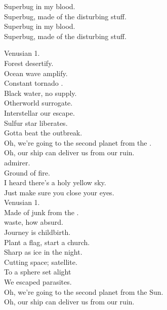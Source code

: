 Superbug in my blood. \\
Superbug, made of the disturbing stuff. \\
Superbug in my blood. \\
Superbug, made of the disturbing stuff. \\





Venusian 1. \\

Forest desertify. \\
Ocean wave amplify. \\
Constant tornado . \\
Black water, no supply. \\
Otherworld surrogate. \\
Interstellar our escape. \\
Sulfur star liberates. \\
Gotta beat the outbreak. \\

Oh, we're going to the second planet from the . \\
Oh, our ship can deliver us from our ruin. \\

 admirer. \\
Ground of fire. \\
I heard there's a holy yellow sky. \\
Just make sure you close your eyes. \\
Venusian 1. \\

Made of junk from the . \\
 waste, how absurd. \\
Journey is childbirth. \\
Plant a flag, start a church. \\
Sharp as ice in the night. \\
Cutting space; satellite. \\
To a sphere set alight \\
We escaped parasites. \\

Oh, we're going to the second planet from the Sun. \\
Oh, our ship can deliver us from our ruin. \\

